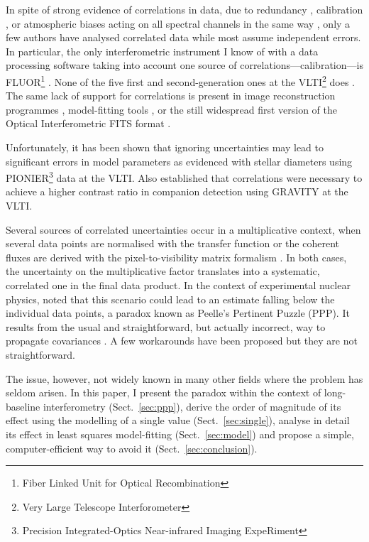 \documentclass[a4paper,fleqn,usenatbib]{mnras}
\begin{document}
In spite of strong evidence of correlations in data, due to redundancy \citep[][in the case of closure phases]{MON07}, calibration \citep{PER03}, or atmospheric biases acting on all spectral channels in the same way \citep{LAW00}, only a few authors \citep{PER04,ABS06,BER06,LAC19,KAM20} have analysed correlated data while most assume independent errors.  In particular, the only interferometric instrument I know of with a data processing software taking into account one source of correlations---calibration---is FLUOR\footnote{Fiber Linked Unit for Optical Recombination} \citep[at IOTA\footnote{Infrared and Optical Telescope Array}, then CHARA\footnote{Center for High Angular Resolution Array}, ][]{PER04}. None of the five first and second-generation ones at the VLTI\footnote{Very Large Telescope Interforometer} does \citep{AMBER,MIDI,PIONIER,GRAVITYpipe,MATISSEpipe}.  The same lack of support for correlations is present in image reconstruction programmes \citep[e.g. MIRA, see][]{THI08}, model-fitting tools \citep[e.g. Litpro, see][]{TAL08}, or the still widespread first version of the Optical Interferometric FITS format \citep[OIFITS v. 1,][]{OIFITS1}.

Unfortunately, it has been shown that ignoring uncertainties may lead to significant errors in model parameters as \citet{LAC19} evidenced with stellar diameters using PIONIER\footnote{Precision Integrated-Optics Near-infrared Imaging ExpeRiment} \citep{PIONIER} data at the VLTI. Also \citet{KAM20} established that correlations were necessary to achieve a higher contrast ratio in companion detection using GRAVITY \citep{GRAVITY} at the VLTI. 

Several sources of correlated uncertainties occur in a multiplicative context, when several data points are normalised with the transfer function \citep{PER03} or the coherent fluxes are derived with the pixel-to-visibility matrix formalism \citep{TAT07}.  In both cases, the uncertainty on the multiplicative factor translates into a systematic, correlated one in the final data product. In the context of experimental nuclear physics, \citet{PEE87} noted that this scenario could lead to an estimate falling below the individual data points, a paradox known as Peelle's Pertinent Puzzle (PPP). It results from the usual and straightforward, but actually incorrect, way to propagate covariances \citep{DAG94,NEU12}.  A few workarounds have been proposed \citep[e.g.][]{BUR11,BEC12,NIS14} but they are not straightforward.

The issue, however, not widely known in many other fields where the problem has seldom arisen.  In this paper, I present the paradox within the context of long-baseline interferometry (Sect.~\ref{sec:ppp}), derive the order of magnitude of its effect using the modelling of a single value (Sect.~\ref{sec:single}), analyse in detail its effect in least squares model-fitting (Sect.~\ref{sec:model}) and propose a simple, computer-efficient way to avoid it (Sect.~\ref{sec:conclusion}).  
\end{document}
